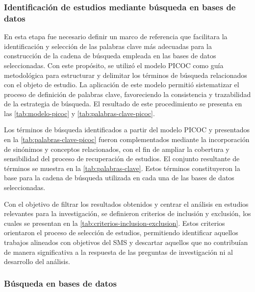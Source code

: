 \subsubsection{Identificación de estudios mediante búsqueda en bases de datos}\label{subsubsec:identificacion-estudios}

En esta etapa fue necesario definir un marco de referencia que facilitara la identificación y selección de las palabras clave más adecuadas para la construcción de la cadena de búsqueda empleada en las bases de datos seleccionadas. Con este propósito, se utilizó el modelo \ac{PICOC} como guía metodológica para estructurar y delimitar los términos de búsqueda relacionados con el objeto de estudio. La aplicación de este modelo permitió sistematizar el proceso de definición de palabras clave, favoreciendo la consistencia y trazabilidad de la estrategia de búsqueda. El resultado de este procedimiento se presenta en las \autoref{tab:modelo-picoc} y \autoref{tab:palabras-clave-picoc}.




Los términos de búsqueda identificados a partir del modelo \ac{PICOC} y presentados en la \autoref{tab:palabras-clave-picoc} fueron complementados mediante la incorporación de sinónimos y conceptos relacionados, con el fin de ampliar la cobertura y sensibilidad del proceso de recuperación de estudios. El conjunto resultante de términos se muestra en la \autoref{tab:palabras-clave}. Estos términos constituyeron la base para la cadena de búsqueda utilizada en cada una de las bases de datos seleccionadas.



Con el objetivo de filtrar los resultados obtenidos y centrar el análisis en estudios relevantes para la investigación, se definieron criterios de inclusión y exclusión, los cuales se presentan en la \autoref{tab:criterios-inclusion-exclusion}. Estos criterios orientaron el proceso de selección de estudios, permitiendo identificar aquellos trabajos alineados con objetivos del \ac{SMS} y descartar aquellos que no contribuían de manera significativa a la respuesta de las preguntas de investigación ni al desarrollo del análisis.




\subsubsection{Búsqueda en bases de datos}\label{par:busqueda-bases-datos}

